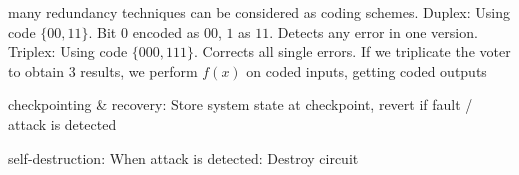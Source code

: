 \documentclass[landscape, a4paper]{article}
\begin{document}
\begin{minipage}[t]{0.2\linewidth}
\begin{betterlist}
\begin{betterlist}
\begin{betterlist}
				\begin{betterlist}
					\item many redundancy techniques can be considered as coding schemes. \alert{Duplex:} Using code $\{00, 11\}$. Bit $0$ encoded as $00$, $1$ as $11$. Detects any error in one version. \alert{Triplex:} Using code $\{000, 111\}$. Corrects all single errors. If we triplicate the voter to obtain 3 results, we perform $f(x)$ on coded inputs, getting coded outputs

					\item \alert{checkpointing \& recovery:} Store system state at checkpoint, revert if fault / attack is detected

					\item \alert{self-destruction:} When attack is detected: Destroy circuit
				\end{betterlist}


\end{betterlist}
\end{betterlist}
\end{betterlist}
\end{minipage}
\end{document}
